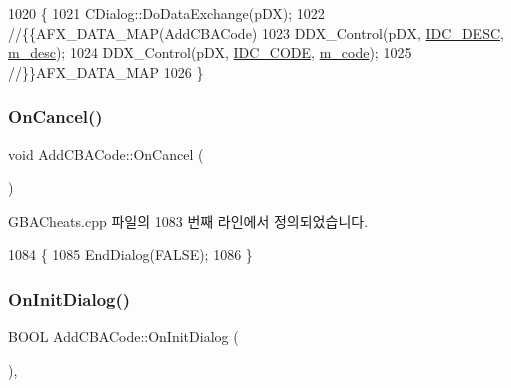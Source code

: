 \begin{DoxyCode}
1020 \{
1021   CDialog::DoDataExchange(pDX);
1022   \textcolor{comment}{//\{\{AFX\_DATA\_MAP(AddCBACode)}
1023   DDX\_Control(pDX, \mbox{\hyperlink{resource_8h_adb05cf1e74135587a9b3ab93a5152feb}{IDC\_DESC}}, \mbox{\hyperlink{class_add_c_b_a_code_ab5056f88f9c1f58a20a1ce718599305b}{m\_desc}});
1024   DDX\_Control(pDX, \mbox{\hyperlink{resource_8h_abb149f0043fd3834639ddb2d80d31723}{IDC\_CODE}}, \mbox{\hyperlink{class_add_c_b_a_code_ab4b404e9aed23e5dd265f543e98c9c6c}{m\_code}});
1025   \textcolor{comment}{//\}\}AFX\_DATA\_MAP}
1026 \}
\end{DoxyCode}
\mbox{\label{class_add_c_b_a_code_a94c94b1c124bb028f9237ee9bfa9f41d}} 
\subsubsection{\texorpdfstring{On\+Cancel()}{OnCancel()}}
{\footnotesize\ttfamily void Add\+C\+B\+A\+Code\+::\+On\+Cancel (\begin{DoxyParamCaption}{ }\end{DoxyParamCaption})\hspace{0.3cm}{\ttfamily [protected]}}



G\+B\+A\+Cheats.\+cpp 파일의 1083 번째 라인에서 정의되었습니다.


\begin{DoxyCode}
1084 \{
1085   EndDialog(FALSE);
1086 \}
\end{DoxyCode}
\mbox{\label{class_add_c_b_a_code_a302c75c08dacdd95eecff6b3b74ebbe6}} 
\subsubsection{\texorpdfstring{On\+Init\+Dialog()}{OnInitDialog()}}
{\footnotesize\ttfamily B\+O\+OL Add\+C\+B\+A\+Code\+::\+On\+Init\+Dialog (\begin{DoxyParamCaption}{ }\end{DoxyParamCaption})\hspace{0.3cm}{\ttfamily [protected]}, {\ttfamily [virtual]}}



